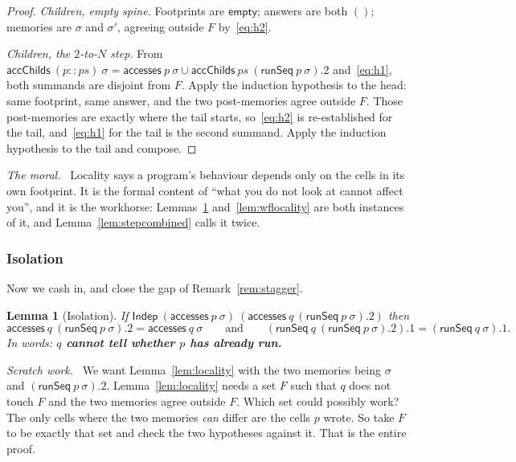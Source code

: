 \documentclass[11pt,a4paper]{article}
\theoremstyle{definition}
\theoremstyle{plain}
\newtheorem{lemma}[definition]{Lemma}
\theoremstyle{remark}
\newenvironment{scratch}{\par\medskip\noindent\textit{Scratch work.}\ \ignorespaces}{\par\medskip}
\newenvironment{moral}{\par\medskip\noindent\textit{The moral.}\ \ignorespaces}{\par\medskip}
\newcommand{\st}{\sigma}
\newcommand{\acc}{\mathsf{accesses}}
\newcommand{\runSeq}{\mathsf{runSeq}}
\newcommand{\Indep}{\mathsf{Indep}}
\begin{document}
\begin{proof}
\emph{Children, empty spine.} Footprints are $\mathsf{empty}$; answers are both $()$;
memories are $\st$ and $\st'$, agreeing outside $F$ by~\eqref{eq:h2}.

\emph{Children, the $2$-to-$N$ step.} From
$\mathsf{accChilds}\ (p :: ps)\ \st = \acc\ p\ \st \cup \mathsf{accChilds}\ ps\ (\runSeq\ p\ \st).2$
and~\eqref{eq:h1}, both summands are disjoint from $F$. Apply the induction hypothesis to the
head: same footprint, same answer, and the two post-memories agree outside $F$. Those
post-memories are exactly where the tail starts, so~\eqref{eq:h2} is re-established for the
tail, and~\eqref{eq:h1} for the tail is the second summand. Apply the induction hypothesis to
the tail and compose.
\end{proof}

\begin{moral}
Locality says a program's behaviour depends only on the cells in its own footprint. It is
the formal content of ``what you do not look at cannot affect you'', and it is the workhorse:
Lemmas~\ref{lem:isolated} and~\ref{lem:wflocality} are both instances of it, and
Lemma~\ref{lem:stepcombined} calls it twice.
\end{moral}

\subsubsection{Isolation}

Now we cash in, and close the gap of Remark~\ref{rem:stagger}.

\begin{lemma}[Isolation]\label{lem:isolated}
If $\Indep\ (\acc\ p\ \st)\ (\acc\ q\ (\runSeq\ p\ \st).2)$ then
\[
  \acc\ q\ (\runSeq\ p\ \st).2 = \acc\ q\ \st
  \qquad\text{and}\qquad
  (\runSeq\ q\ (\runSeq\ p\ \st).2).1 = (\runSeq\ q\ \st).1 .
\]
In words: \textbf{$q$ cannot tell whether $p$ has already run.}
\end{lemma}

\begin{scratch}
We want Lemma~\ref{lem:locality} with the two memories being $\st$ and $(\runSeq\ p\ \st).2$.
Lemma~\ref{lem:locality} needs a set $F$ such that $q$ does not touch $F$ and the two
memories agree outside $F$. Which set could possibly work? The only cells where the two
memories \emph{can} differ are the cells $p$ wrote. So take $F$ to be exactly that set and
check the two hypotheses against it. That is the entire proof.
\end{scratch}
\end{document}
